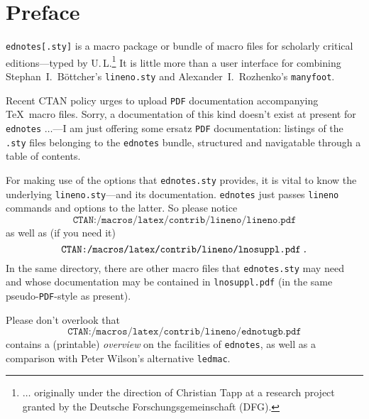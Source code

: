 \documentclass[10pt]{article}
\newcommand*{\cs}[1]{\texttt{\char"5C #1}}
\newcommand*{\lcurl}[1]{\[\texttt{CTAN:/macros/latex/contrib/#1}\]}
\begin{document}
\maketitle
\section*{Preface}

\texttt{ednotes[.sty]} is a macro package or bundle of 
macro files for scholarly critical editions---typed 
by U.\,L.\footnote{$\dots$ originally under the direction of 
Christian Tapp at a research project granted by the 
Deutsche Forschungsgemeinschaft (DFG).}
It is little more than a user interface for combining 
Stephan~I.\ B\"ottcher's \texttt{lineno.sty} and 
Alexander~I.~Rozhenko's \texttt{manyfoot}. 

Recent CTAN policy urges to upload \texttt{PDF} 
documentation accompanying \TeX\ macro files. 
% 
Sorry, a documentation of this kind doesn't exist 
at present for \texttt{ednotes} $\dots$---I am just offering 
some ersatz \texttt{PDF} documentation: listings of the 
\texttt{.sty} files belonging to the \texttt{ednotes} bundle, 
structured and navigatable through a table of contents. 

For making use of the options that \texttt{ednotes.sty} 
provides, it is vital to know the underlying 
\texttt{lineno.sty}---and its documentation. 
\texttt{ednotes} just passes \texttt{lineno} commands and 
options to the latter. So please notice 
\lcurl{lineno/lineno.pdf}
as well as (if you need it) 
\lcurl{lineno/lnosuppl.pdf\,.}
In the same directory, there are other macro files that 
\texttt{ednotes.sty} may need and whose documentation may 
be contained in \texttt{lnosuppl.pdf} (in the same 
pseudo-\texttt{PDF}-style as present). 


Please don't overlook that \lcurl{lineno/ednotugb.pdf} contains 
a (printable) \emph{overview} on the facilities of 
\texttt{ednotes}, as well as a comparison with Peter Wilson's 
alternative \texttt{ledmac}. 
\end{document}
